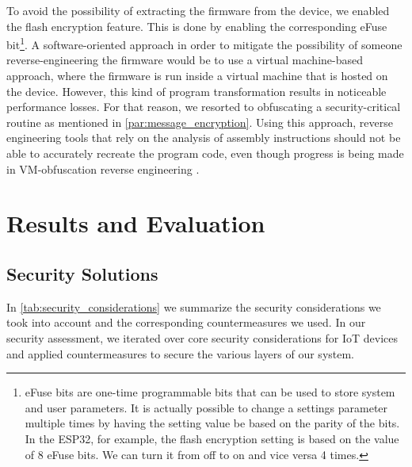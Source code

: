 \documentclass[conference]{IEEEtran}
\begin{document}
To avoid the possibility of extracting the firmware from the device,
we enabled the flash encryption feature. This is done by enabling the
corresponding eFuse bit\footnote{eFuse bits are one-time programmable bits that
can be used to store system and user parameters. 
It is actually possible to change a settings parameter multiple times by having the setting 
value be based on the parity of the  bits. In the ESP32, for example, the flash encryption setting 
is based on the value of 8 eFuse bits. We can turn it from off to on and vice versa 4 times.
}. A software-oriented approach in order to mitigate the possibility of someone reverse-engineering the firmware would be to use
a virtual machine-based approach,
where the firmware is run inside a virtual machine that is hosted on the device.
However, this kind of program transformation results in noticeable performance losses.
For that reason, we resorted to obfuscating a security-critical routine as mentioned in \cref{par:message_encryption}.
Using this approach, reverse engineering tools that rely on the analysis of
assembly instructions should not be able to accurately recreate the program
code, even though progress is being made in VM-obfuscation reverse engineering \cite{VMReversing, UnpackingVirtualizationObfuscators}.

\section{Results and Evaluation}

\subsection{Security Solutions}

In \cref{tab:security_considerations} we summarize the security considerations we took into account and the corresponding countermeasures we used.
In our security assessment, we iterated over core security considerations for IoT devices\cite{ComprehensiveSecurity} and applied countermeasures 
to secure the various layers of our system.
\end{document}
